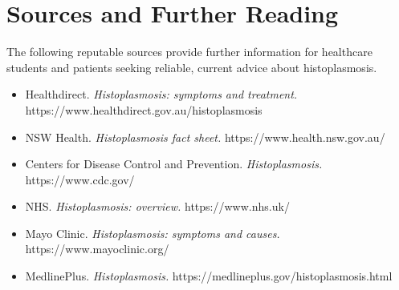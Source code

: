 \section*{Sources and Further Reading}
The following reputable sources provide further information for healthcare students and patients seeking reliable, current advice about histoplasmosis.

\begin{itemize}
    \item Healthdirect. \textit{Histoplasmosis: symptoms and treatment.} https://www.healthdirect.gov.au/histoplasmosis
    \item NSW Health. \textit{Histoplasmosis fact sheet.} https://www.health.nsw.gov.au/
    \item Centers for Disease Control and Prevention. \textit{Histoplasmosis.} https://www.cdc.gov/
    \item NHS. \textit{Histoplasmosis: overview.} https://www.nhs.uk/
    \item Mayo Clinic. \textit{Histoplasmosis: symptoms and causes.} https://www.mayoclinic.org/
    \item MedlinePlus. \textit{Histoplasmosis.} https://medlineplus.gov/histoplasmosis.html
\end{itemize}
